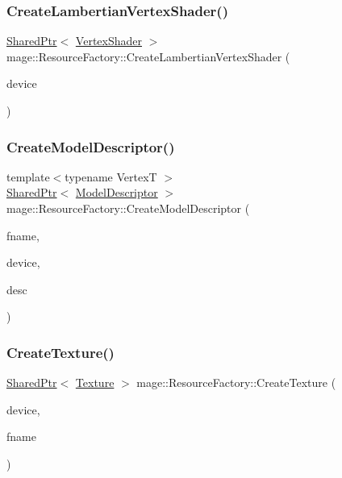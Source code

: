 \subsubsection{\texorpdfstring{Create\+Lambertian\+Vertex\+Shader()}{CreateLambertianVertexShader()}}
{\footnotesize\ttfamily \hyperlink{namespacemage_a1e01ae66713838a7a67d30e44c67703e}{Shared\+Ptr}$<$ \hyperlink{classmage_1_1_vertex_shader}{Vertex\+Shader} $>$ mage\+::\+Resource\+Factory\+::\+Create\+Lambertian\+Vertex\+Shader (\begin{DoxyParamCaption}\item[{I\+D3\+D11\+Device2 \&}]{device }\end{DoxyParamCaption})}

\hypertarget{classmage_1_1_resource_factory_a7e669ea18fa558ba6f794bdf5cd209fe}{}\label{classmage_1_1_resource_factory_a7e669ea18fa558ba6f794bdf5cd209fe} 
\subsubsection{\texorpdfstring{Create\+Model\+Descriptor()}{CreateModelDescriptor()}}
{\footnotesize\ttfamily template$<$typename VertexT $>$ \\
\hyperlink{namespacemage_a1e01ae66713838a7a67d30e44c67703e}{Shared\+Ptr}$<$ \hyperlink{classmage_1_1_model_descriptor}{Model\+Descriptor} $>$ mage\+::\+Resource\+Factory\+::\+Create\+Model\+Descriptor (\begin{DoxyParamCaption}\item[{const wstring \&}]{fname,  }\item[{I\+D3\+D11\+Device2 \&}]{device,  }\item[{const \hyperlink{structmage_1_1_mesh_descriptor}{Mesh\+Descriptor}$<$ VertexT $>$ \&}]{desc }\end{DoxyParamCaption})}

\hypertarget{classmage_1_1_resource_factory_aa705b55d95fe90edb86e84594e0d85d4}{}\label{classmage_1_1_resource_factory_aa705b55d95fe90edb86e84594e0d85d4} 
\subsubsection{\texorpdfstring{Create\+Texture()}{CreateTexture()}}
{\footnotesize\ttfamily \hyperlink{namespacemage_a1e01ae66713838a7a67d30e44c67703e}{Shared\+Ptr}$<$ \hyperlink{classmage_1_1_texture}{Texture} $>$ mage\+::\+Resource\+Factory\+::\+Create\+Texture (\begin{DoxyParamCaption}\item[{I\+D3\+D11\+Device2 \&}]{device,  }\item[{const wstring \&}]{fname }\end{DoxyParamCaption})}

